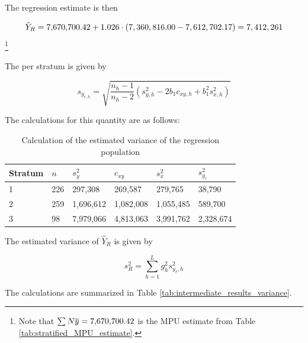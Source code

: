 The regression estimate is then

\begin{equation*}
	\hat{Y}_R = \AuxStratifiedMpuEstimate + 1.026 \cdot (7,360,816.00 - 7,612,702.17) = 7,412,261
	\end{equation*}\footnote{Note that $\sum{N \overline{y}} = \AuxStratifiedMpuEstimate$ is the MPU estimate from Table \ref{tab:stratified_MPU_estimate}.}

The  per stratum is given by

\begin{equation}
s_{y_{r, h}} = \sqrt{\frac{n_h - 1}{n_h - 2}(s_{y, h}^2 - 2 b_1 c_{xy, h} + b_1^2 s_{x, h}^2)}
\label{eq:standard_error_regression_population_stratum}
\end{equation}

The calculations for this quantity are as follows:

\begin{table}[htbp]
\begin{tabularx}{\textwidth}{X Y Y Y Y Y}
\toprule
\parbox[t]{1.4 cm}{Stratum} &
$n$ &
$s_y^2$ &
$c_{xy}$ &
$s_x^2$ &
$s_{y_r}^2$ \\

\midrule

1 & 226 &   297,308 &   269,587 &   279,765 &    38,790 \\
2 & 259 & 1,696,612 & 1,082,008 & 1,055,485 &   589,700 \\
3 &  98 & 7,979,066 & 4,813,063 & 3,991,762 & 2,328,674 \\

\bottomrule
\end{tabularx}
\caption{Calculation of the estimated variance of the regression population}
\label{tab:standard_error_regression}
\end{table}

\bigskip
The estimated variance of $\hat{Y}_{R}$ is given by

\begin{equation}
s^2_{R} = \sum_{h = 1}^{L}g_h^2 s_{y_r,h}^2
\label{eq:estimated_variance_regression}
\end{equation}

The calculations are summarized in Table \ref{tab:intermediate_results_variance}.

